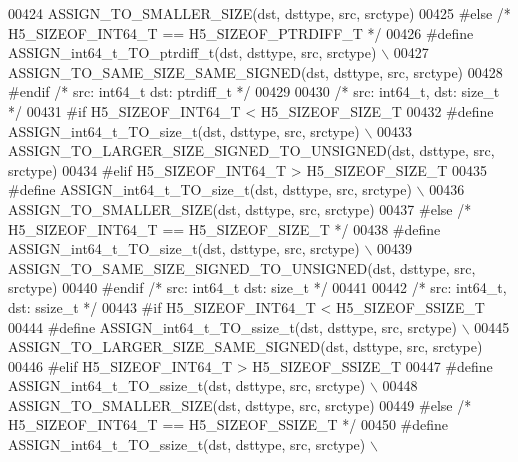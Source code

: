 \begin{DoxyCode}
00424 \textcolor{preprocessor}{        ASSIGN\_TO\_SMALLER\_SIZE(dst, dsttype, src, srctype)}
00425 \textcolor{preprocessor}{#else }\textcolor{comment}{/* H5\_SIZEOF\_INT64\_T == H5\_SIZEOF\_PTRDIFF\_T */}\textcolor{preprocessor}{}
00426 \textcolor{preprocessor}{    #define ASSIGN\_int64\_t\_TO\_ptrdiff\_t(dst, dsttype, src, srctype) \(\backslash\)}
00427 \textcolor{preprocessor}{        ASSIGN\_TO\_SAME\_SIZE\_SAME\_SIGNED(dst, dsttype, src, srctype)}
00428 \textcolor{preprocessor}{#endif }\textcolor{comment}{/* src: int64\_t dst: ptrdiff\_t */}\textcolor{preprocessor}{}
00429 
00430 \textcolor{comment}{/* src: int64\_t, dst: size\_t */}
00431 \textcolor{preprocessor}{#if H5\_SIZEOF\_INT64\_T < H5\_SIZEOF\_SIZE\_T}
00432 \textcolor{preprocessor}{    #define ASSIGN\_int64\_t\_TO\_size\_t(dst, dsttype, src, srctype) \(\backslash\)}
00433 \textcolor{preprocessor}{        ASSIGN\_TO\_LARGER\_SIZE\_SIGNED\_TO\_UNSIGNED(dst, dsttype, src, srctype)}
00434 \textcolor{preprocessor}{#elif H5\_SIZEOF\_INT64\_T > H5\_SIZEOF\_SIZE\_T}
00435 \textcolor{preprocessor}{    #define ASSIGN\_int64\_t\_TO\_size\_t(dst, dsttype, src, srctype) \(\backslash\)}
00436 \textcolor{preprocessor}{        ASSIGN\_TO\_SMALLER\_SIZE(dst, dsttype, src, srctype)}
00437 \textcolor{preprocessor}{#else }\textcolor{comment}{/* H5\_SIZEOF\_INT64\_T == H5\_SIZEOF\_SIZE\_T */}\textcolor{preprocessor}{}
00438 \textcolor{preprocessor}{    #define ASSIGN\_int64\_t\_TO\_size\_t(dst, dsttype, src, srctype) \(\backslash\)}
00439 \textcolor{preprocessor}{        ASSIGN\_TO\_SAME\_SIZE\_SIGNED\_TO\_UNSIGNED(dst, dsttype, src, srctype)}
00440 \textcolor{preprocessor}{#endif }\textcolor{comment}{/* src: int64\_t dst: size\_t */}\textcolor{preprocessor}{}
00441 
00442 \textcolor{comment}{/* src: int64\_t, dst: ssize\_t */}
00443 \textcolor{preprocessor}{#if H5\_SIZEOF\_INT64\_T < H5\_SIZEOF\_SSIZE\_T}
00444 \textcolor{preprocessor}{    #define ASSIGN\_int64\_t\_TO\_ssize\_t(dst, dsttype, src, srctype) \(\backslash\)}
00445 \textcolor{preprocessor}{        ASSIGN\_TO\_LARGER\_SIZE\_SAME\_SIGNED(dst, dsttype, src, srctype)}
00446 \textcolor{preprocessor}{#elif H5\_SIZEOF\_INT64\_T > H5\_SIZEOF\_SSIZE\_T}
00447 \textcolor{preprocessor}{    #define ASSIGN\_int64\_t\_TO\_ssize\_t(dst, dsttype, src, srctype) \(\backslash\)}
00448 \textcolor{preprocessor}{        ASSIGN\_TO\_SMALLER\_SIZE(dst, dsttype, src, srctype)}
00449 \textcolor{preprocessor}{#else }\textcolor{comment}{/* H5\_SIZEOF\_INT64\_T == H5\_SIZEOF\_SSIZE\_T */}\textcolor{preprocessor}{}
00450 \textcolor{preprocessor}{    #define ASSIGN\_int64\_t\_TO\_ssize\_t(dst, dsttype, src, srctype) \(\backslash\)}

\end{DoxyCode}
